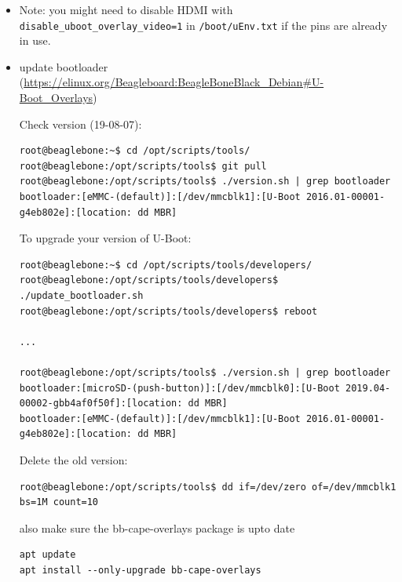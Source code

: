 \documentclass[
	fontsize=10pt
	paper=a4
]{scrartcl}
\begin{document}
\begin{itemize}
\item Note: you might need to disable HDMI with \texttt{disable\_uboot\_overlay\_video=1} in \texttt{/boot/uEnv.txt} if the pins are already in use.

\item update bootloader (\url{https://elinux.org/Beagleboard:BeagleBoneBlack_Debian#U-Boot_Overlays})

Check version (19-08-07):
\begin{lstlisting}
root@beaglebone:~$ cd /opt/scripts/tools/
root@beaglebone:/opt/scripts/tools$ git pull
root@beaglebone:/opt/scripts/tools$ ./version.sh | grep bootloader
bootloader:[eMMC-(default)]:[/dev/mmcblk1]:[U-Boot 2016.01-00001-g4eb802e]:[location: dd MBR]
\end{lstlisting}

To upgrade your version of U-Boot: 
\begin{lstlisting}
root@beaglebone:~$ cd /opt/scripts/tools/developers/
root@beaglebone:/opt/scripts/tools/developers$ ./update_bootloader.sh
root@beaglebone:/opt/scripts/tools/developers$ reboot

...

root@beaglebone:/opt/scripts/tools$ ./version.sh | grep bootloader
bootloader:[microSD-(push-button)]:[/dev/mmcblk0]:[U-Boot 2019.04-00002-gbb4af0f50f]:[location: dd MBR]
bootloader:[eMMC-(default)]:[/dev/mmcblk1]:[U-Boot 2016.01-00001-g4eb802e]:[location: dd MBR]
\end{lstlisting}

Delete the old version:
\begin{lstlisting}
root@beaglebone:/opt/scripts/tools$ dd if=/dev/zero of=/dev/mmcblk1 bs=1M count=10
\end{lstlisting}


also make sure the bb-cape-overlays package is upto date
\begin{lstlisting}
apt update
apt install --only-upgrade bb-cape-overlays
\end{lstlisting}
\end{itemize}
\end{document}
